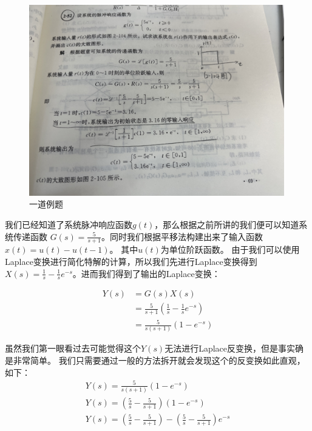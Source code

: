 \documentclass{ctexart}
\begin{document}
\begin{figure}[H]
    \centering
    \includegraphics[width=0.99\textwidth]{./pics/deeply_understand_control_theory/example1.jpg}
    \caption{一道例题}
    \label{Fig.7}
\end{figure}

我们已经知道了系统脉冲响应函数$g(t)$，那么根据之前所讲的我们便可以知道系统传递函数
$G(s) = \frac{5}{s + 1}$。同时我们根据平移法构建出来了输入函数$x(t) = u(t) - u(t-1)$。
其中$u(t)$为单位阶跃函数。
由于我们可以使用Laplace变换进行简化特解的计算，所以我们先进行Laplace变换得到
$X(s) = \frac{1}{s} - \frac{1}{s} e^{-s}$。进而我们得到了输出的Laplace变换：

\begin{equation}
    \begin{aligned}
        Y(s) & = G(s) X(s)                                         \\
             & = \frac{5}{s + 1}(\frac{1}{s} - \frac{1}{s} e^{-s}) \\
             & =\frac{5}{s(s + 1)}(1 - e^{-s})
    \end{aligned}
    \label{eq:11}
\end{equation}

虽然我们第一眼看过去可能觉得这个$Y(s)$无法进行Laplace反变换，但是事实确是非常简单。
我们只需要通过一般的方法拆开就会发现这个的反变换如此直观，如下：
\begin{gather}
    Y(s) = \frac{5}{s(s + 1)}(1 - e^{-s}) \\
    Y(s) = (\frac{5}{s} - \frac{5}{s+1}) (1 - e^{-s}) \\
    Y(s) = (\frac{5}{s} - \frac{5}{s+1}) - (\frac{5}{s} - \frac{5}{s+1}) e^{-s}
\end{gather}
\end{document}
